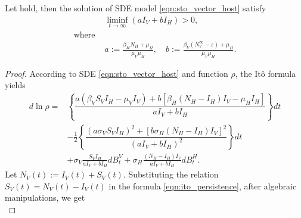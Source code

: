 \begin{theorem}
    Let  hold, then the solution of SDE model
    \eqref{eqn:sto_vector_host} satisfy
    \begin{align*}
        &\liminf_{t \to \infty}
            (a I_V + b I_H) > 0, \\
            \text{where }&
            \\
            & a:= \frac{\beta_H N_H + \mu_H}{\mu_V \mu_H},
            \quad
            b:=
            \frac{
                \beta_V (N_V ^ {\infty} - \varepsilon)
                + \mu_H
                }{\mu_V \mu_H}.
    \end{align*}
\end{theorem}
%
\begin{proof}
    According to SDE \eqref{eqn:sto_vector_host} and function $\rho$,
    the It\^{o} formula yields
    \begin{equation} \label{eqn:ito_persistence} 
        \begin{aligned}
          d \ln \rho =&
            \left \{
                \dfrac{
                    a (\beta_V S_V I_H - \mu_V I_V)
                    +
                    b [\beta_H (N_H - I_H) I_V - \mu_H I_H]
                }{a I_V + bI_H}
            \right \} dt
            \\
            & -
            \frac{1}{2}
            \left \{
                \dfrac{
                    \left(
                        a \sigma_V S_V I_H
                    \right) ^ 2
                    +
                    \left[
                        b \sigma_H (N_H - I_H) I_V
                    \right] ^2
                }{
                    \left( 
                        a I_V + bI_H
                    \right) ^ 2
                }
            \right \} dt
            \\
            & +
            \sigma_V 
            \frac{S_V I_H}{a I_V + b I_H}
            d B_t ^ V
            +
            \sigma_H 
            \frac{(N_H - I_H) I_V}{a I_V + b I_H}
            d B_t ^ H .
        \end{aligned}
    \end{equation}
    Let $N_V(t):= I_V(t) + S_V(t)$. Substituting the relation
    $S_V(t)= N_V(t) - I_V(t)$ in the formula \eqref{eqn:ito_persistence}, %
    after algebraic manipulations, we get
    \begin{equation}\label{eqn:ito_bound_1}

\end{equation}
\end{proof}
